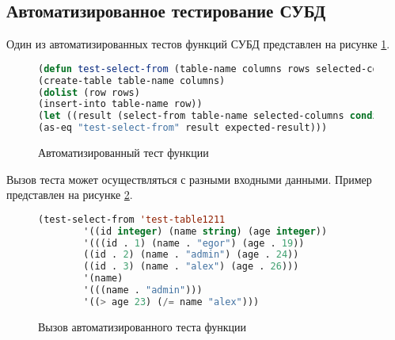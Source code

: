 \subsection{Автоматизированное тестирование СУБД}

Один из автоматизированных тестов функций СУБД представлен на рисунке \ref{unittest:image}.

\begin{figure}[ht]
\begin{lstlisting}[language=Lisp]
(defun test-select-from (table-name columns rows selected-columns expected-result &optional condition)
(create-table table-name columns)
(dolist (row rows)
(insert-into table-name row))
(let ((result (select-from table-name selected-columns condition)))
(as-eq "test-select-from" result expected-result)))
\end{lstlisting}  
\caption{Автоматизированный тест функции}
\label{unittest:image}
\end{figure}

Вызов теста может осуществляться с разными входными данными. Пример представлен на рисунке \ref{unittestEx:image}.

\begin{figure}[ht]
\begin{lstlisting}[language=Lisp]
		(test-select-from 'test-table1211
		'((id integer) (name string) (age integer))
		'(((id . 1) (name . "egor") (age . 19))
		((id . 2) (name . "admin") (age . 24))
		((id . 3) (name . "alex") (age . 26)))
		'(name)
		'(((name . "admin")))
		'((> age 23) (/= name "alex")))
\end{lstlisting}  
\caption{Вызов автоматизированного теста функции}
\label{unittestEx:image}
\end{figure}
